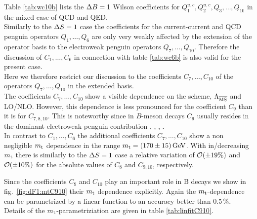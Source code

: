 Table \ref{tab:wc10b} lists the $\Delta B=1$ Wilson coefficients for
$Q_1^{u,c},Q_2^{u,c},Q_3,\ldots,Q_{10}$ in the mixed case of QCD and
QED.
\\
Similarly to the $\Delta S=1$ case the coefficients for the current-current and
QCD penguin operators $Q_1,\ldots,Q_6$ are only very weakly affected by
the extension of the operator basis to the electroweak penguin
operators $Q_7,\ldots,Q_{10}$. Therefore the discussion of
$C_1,\ldots,C_6$ in connection with table \ref{tab:wc6b} is also valid
for the present case.
\\
Here we therefore restrict our discussion to the coefficients
$C_7,\ldots,C_{10}$ of the operators $Q_7,\ldots,Q_{10}$ in the
extended basis.
\\
The coefficients $C_7,\ldots,C_{10}$ show a visible dependence on the
scheme, $\Lambda_{\overline{\rm MS}}$ and LO/NLO. However, this dependence is less pronounced
for the coefficient $C_9$ than it is for $C_{7,8,10}$. This is
noteworthy since in $B$-meson decays $C_9$ usually resides in the
dominant electroweak penguin contribution \cite{fleischer:94a},
\cite{fleischer:94b}, \cite{deshpandeetal:94}, \cite{deshpandehe:94}.
\\
In contrast to $C_1,\ldots,C_6$ the additional coefficients
$C_7,\ldots,C_{10}$ show a non negligible $m_{\rm t}$ dependence in the range
$m_{\rm t} = (170 \pm 15)\, {\rm GeV}$. With in/decreasing $m_{\rm t}$ there is similarly to
the $\Delta S=1$ case a relative variation of ${\cal O}(\pm 19\%)$ and ${\cal O}(\pm
10\%)$ for the absolute values of $C_8$ and $C_{9,10}$, respectively.

Since the coefficients $C_9$ and $C_{10}$ play an important role in
B decays we show in fig.\ \ref{fig:dF1:mtC910} their $m_{\rm t}$ dependence
explicitly. Again the $m_{\rm t}$-dependence can be parametrized by a linear
function to an accuracy better than $0.5\,\%$. Details of the
$m_{\rm t}$-parametriziation are given in table \ref{tab:linfitC910}.

